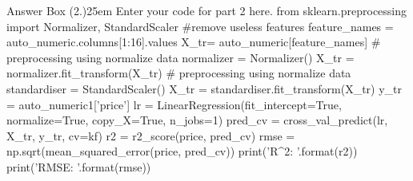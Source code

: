 \documentclass[12pt]{article}
\begin{document}
\begin{code}{Answer Box (2.)}{25em}
    Enter your code for part 2 here.
    from sklearn.preprocessing import Normalizer, StandardScaler
    #remove useless features
    feature_names = auto_numeric.columns[1:16].values
    X_tr= auto_numeric[feature_names]
    # preprocessing using normalize data
    normalizer = Normalizer()
    X_tr  = normalizer.fit_transform(X_tr)
    # preprocessing using normalize data
    standardiser = StandardScaler()
    X_tr  = standardiser.fit_transform(X_tr)
    y_tr = auto_numeric1['price']
    lr = LinearRegression(fit_intercept=True, normalize=True, copy_X=True, n_jobs=1)
    pred_cv = cross_val_predict(lr, X_tr, y_tr, cv=kf)
    r2 = r2_score(price, pred_cv)
    rmse = np.sqrt(mean_squared_error(price, pred_cv))
    print('R^2: {}'.format(r2))
    print('RMSE: {}'.format(rmse))
\end{code}




\end{document}
